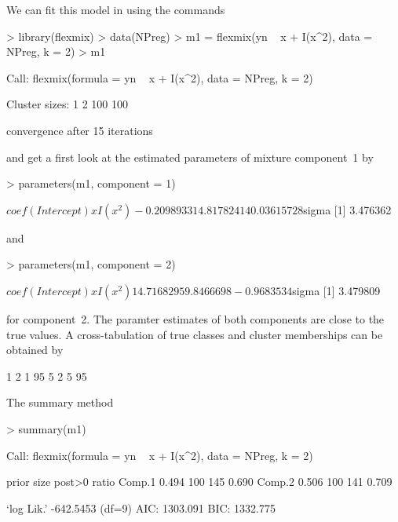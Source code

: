 \documentclass{jss}
\newcommand{\R}{\proglang{R}}
\begin{document}
We can fit this model in \R{} using the commands
\begin{Schunk}
\begin{Sinput}
> library(flexmix)
> data(NPreg)
> m1 = flexmix(yn ~ x + I(x^2), data = NPreg, k = 2)
> m1
\end{Sinput}
\begin{Soutput}
Call:
flexmix(formula = yn ~ x + I(x^2), data = NPreg, 
    k = 2)

Cluster sizes:
  1   2 
100 100 

convergence after 15 iterations
\end{Soutput}
\end{Schunk}
and get a first look at the estimated parameters of mixture component~1 by 
\begin{Schunk}
\begin{Sinput}
> parameters(m1, component = 1)
\end{Sinput}
\begin{Soutput}
$coef
(Intercept)           x      I(x^2) 
-0.20989331  4.81782414  0.03615728 

$sigma
[1] 3.476362
\end{Soutput}
\end{Schunk}
and
\begin{Schunk}
\begin{Sinput}
> parameters(m1, component = 2)
\end{Sinput}
\begin{Soutput}
$coef
(Intercept)           x      I(x^2) 
 14.7168295   9.8466698  -0.9683534 

$sigma
[1] 3.479809
\end{Soutput}
\end{Schunk}
for component~2. The paramter estimates of both components are close
to the true values. A cross-tabulation of true classes and cluster
memberships can be obtained by
\begin{Schunk}
\begin{Soutput}
    1  2 
  1 95  5
  2  5 95
\end{Soutput}
\end{Schunk}
The summary method
\begin{Schunk}
\begin{Sinput}
> summary(m1)
\end{Sinput}
\begin{Soutput}
Call:
flexmix(formula = yn ~ x + I(x^2), data = NPreg, 
    k = 2)

       prior size post>0 ratio
Comp.1 0.494  100    145 0.690
Comp.2 0.506  100    141 0.709

`log Lik.' -642.5453 (df=9)
AIC: 1303.091   BIC: 1332.775 
\end{Soutput}
\end{Schunk}
\end{document}
